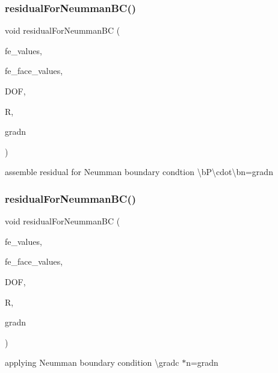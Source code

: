 \subsubsection{\texorpdfstring{residualForNeummanBC()}{residualForNeummanBC()}\hspace{0.1cm}{\footnotesize\ttfamily [1/4]}}
{\footnotesize\ttfamily void residual\+For\+Neumman\+BC (\begin{DoxyParamCaption}\item[{const F\+E\+Values$<$ dim $>$ \&}]{fe\+\_\+values,  }\item[{const F\+E\+Face\+Values$<$ dim $>$ \&}]{fe\+\_\+face\+\_\+values,  }\item[{unsigned int}]{D\+OF,  }\item[{dealii\+::\+Table$<$ 1, T $>$ \&}]{R,  }\item[{dealii\+::\+Table$<$ 2, T $>$ \&}]{gradn }\end{DoxyParamCaption})}

assemble residual for Neumman boundary condtion \textbackslash{}bP\textbackslash{}cdot\textbackslash{}bn=gradn \mbox{\label{class_residual_ad0e81fca1fe14909b80e709c1e93e393}} 
\subsubsection{\texorpdfstring{residualForNeummanBC()}{residualForNeummanBC()}\hspace{0.1cm}{\footnotesize\ttfamily [2/4]}}
{\footnotesize\ttfamily void residual\+For\+Neumman\+BC (\begin{DoxyParamCaption}\item[{const F\+E\+Values$<$ dim $>$ \&}]{fe\+\_\+values,  }\item[{const F\+E\+Face\+Values$<$ dim $>$ \&}]{fe\+\_\+face\+\_\+values,  }\item[{unsigned int}]{D\+OF,  }\item[{dealii\+::\+Table$<$ 1, T $>$ \&}]{R,  }\item[{dealii\+::\+Table$<$ 1, T $>$ \&}]{gradn }\end{DoxyParamCaption})}

applying Neumman boundary condition \textbackslash{}gradc $\ast$n=gradn \mbox{\label{class_residual_af2aedfc68848cd35cac392aad840db05}} 
